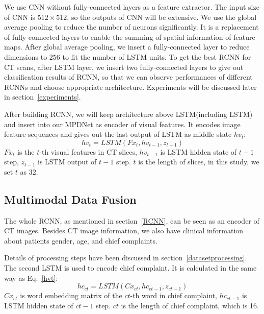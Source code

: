 \documentclass[journal]{IEEEtran}
\begin{document}
We use CNN without fully-connected layers as a feature extractor. The input size of CNN is $512 \times 512$, so the outputs of CNN will be extensive. We use the global average pooling \cite{lin2014network} to reduce the number of neurons significantly. It is a replacement of fully-connected layers to enable the summing of spatial information of feature maps. After global average pooling, we insert a fully-connected layer to reduce dimensions to $256$ to fit the number of LSTM units.
To get the best RCNN for CT scans, after LSTM layer, we insert two fully-connected layers to give out classification results of RCNN, so that we can observe performances of different RCNNs and choose appropriate architecture. Experiments will be discussed later in section~\ref{experiments}.

After building RCNN, we will keep architecture above LSTM(including LSTM) and insert into our MPDNet as encoder of visual features. It encodes image feature sequences and gives out the last output of LSTM as middle state $hv_t$:
\begin{equation}
hv_t = LSTM(Fx_t, hv_{t-1}, z_{t-1})
\label{hvt}
\end{equation}
$Fx_t$ is the $t$-th visual features in CT slices, $hv_{t-1}$ is LSTM hidden state of $t-1$ step, $z_{t-1}$ is LSTM output of $t-1$ step. $t$ is the length of slices, in this study, we set $t$ as 32.


\subsection{Multimodal Data Fusion}
\label{MMDDtxt}

The whole RCNN, as mentioned in section~\ref{RCNN}, can be seen as an encoder of CT images.
Besides CT image information, we also have clinical information about patients gender, age, and chief complaints. 

Details of processing steps have been discussed in section~\ref{datasetprocessing}. The second LSTM is used to encode chief complaint. It is calculated in the same way as Eq.~\ref{hvt}:
\begin{equation}
    hc_{ct} = LSTM(Cx_{ct}, hc_{ct-1}, z_{ct-1})
    \label{hct}
\end{equation}
$Cx_{ct}$ is word embedding matrix of the $ct$-th word in chief complaint, $hc_{ct-1}$ is LSTM hidden state of $ct-1$ step. $ct$ is the length of chief complaint, which is 16. 
\end{document}
